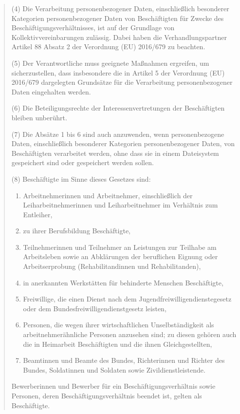 \begin{quotation}
        (4) Die Verarbeitung personenbezogener Daten, einschließlich besonderer Kategorien personenbezogener Daten von Beschäftigten für Zwecke des Beschäftigungsverhältnisses, ist auf der Grundlage von Kollektivvereinbarungen zulässig. Dabei haben die Verhandlungspartner Artikel 88 Absatz 2 der Verordnung (EU) 2016/679 zu beachten.
        
        (5) Der Verantwortliche muss geeignete Maßnahmen ergreifen, um sicherzustellen, dass insbesondere die in Artikel 5 der Verordnung (EU) 2016/679 dargelegten Grundsätze für die Verarbeitung personenbezogener Daten eingehalten werden.
        
        (6) Die Beteiligungsrechte der Interessenvertretungen der Beschäftigten bleiben unberührt.
        
        (7) Die Absätze 1 bis 6 sind auch anzuwenden, wenn personenbezogene Daten, einschließlich besonderer Kategorien personenbezogener Daten, von Beschäftigten verarbeitet werden, ohne dass sie in einem Dateisystem gespeichert sind oder gespeichert werden sollen.
        
        (8) Beschäftigte im Sinne dieses Gesetzes sind:
        \begin{enumerate}
          \item Arbeitnehmerinnen und Arbeitnehmer, einschließlich der Leiharbeitnehmerinnen und Leiharbeitnehmer im Verhältnis zum Entleiher,
          \item zu ihrer Berufsbildung Beschäftigte,
          \item Teilnehmerinnen und Teilnehmer an Leistungen zur Teilhabe am Arbeitsleben sowie an Abklärungen der beruflichen Eignung oder Arbeitserprobung (Rehabilitandinnen und Rehabilitanden),
          \item in anerkannten Werkstätten für behinderte Menschen Beschäftigte,
          \item Freiwillige, die einen Dienst nach dem Jugendfreiwilligendienstegesetz oder dem Bundesfreiwilligendienstgesetz leisten,
          \item Personen, die wegen ihrer wirtschaftlichen Unselbständigkeit als arbeitnehmerähnliche Personen anzusehen sind; zu diesen gehören auch die in Heimarbeit Beschäftigten und die ihnen Gleichgestellten,
          \item Beamtinnen und Beamte des Bundes, Richterinnen und Richter des Bundes, Soldatinnen und Soldaten sowie Zivildienstleistende. 
        \end{enumerate}
        Bewerberinnen und Bewerber für ein Beschäftigungsverhältnis sowie Personen, deren Beschäftigungsverhältnis beendet ist, gelten als Beschäftigte.
    \end{quotation}
  
